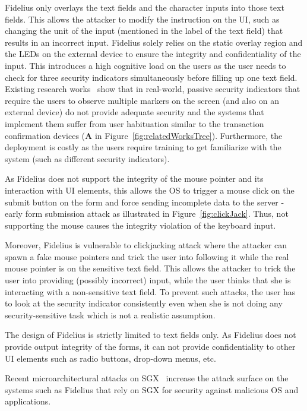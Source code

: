 \begin{mylist}
\item Fidelius only overlays the text fields and the character inputs into those
text fields. This allows the attacker to modify the instruction on the UI, such
as changing the unit of the input (mentioned in the label of the text field)
that results in an incorrect input. Fidelius solely relies on the static overlay
region and the LEDs on the external device to ensure the integrity and
confidentiality of the input. This introduces a high cognitive load on the users
as the user needs to check for three security indicators simultaneously before
filling up one text field. Existing research
works~\cite{egelman2008you,sobey2008exploring} show that in real-world, passive
security indicators that require the users to observe multiple markers on the
screen (and also on an external device) do not provide adequate security and the
systems that implement them suffer from user habituation similar to the
transaction confirmation devices (\textbf{A} in
Figure~\ref{fig:relatedWorksTree}). Furthermore, the deployment is costly as the users require training to get familiarize with the
system (such as different security indicators).
\item As Fidelius does not support the integrity of the mouse pointer and its
interaction with UI elements, this allows the OS to trigger a mouse click on the
submit button on the form and force sending incomplete data to the server -
early form submission attack as illustrated in Figure~\ref{fig:clickJack}. Thus,
not supporting the mouse causes the integrity violation of the keyboard input.


Moreover, Fidelius is vulnerable to clickjacking attack where the attacker can spawn a fake mouse pointers and trick the user into following it while the real mouse pointer is on the sensitive text field. 
This allows the attacker to trick the user into providing (possibly incorrect) input, while the user thinks that she is interacting with a non-sensitive text field. To prevent such attacks, the user has to look at the security indicator consistently even when she is not doing any security-sensitive task which is not a realistic assumption. 
\item The design of Fidelius is strictly limited to text fields only. As Fidelius does not provide output integrity of the forms, it can not provide confidentiality to other UI elements such as radio buttons, drop-down menus, etc.
\item Recent microarchitectural attacks on SGX~\cite{van2018foreshadow} increase the attack surface on the systems such as Fidelius that rely on SGX for security against malicious OS and applications. 
\end{mylist}



